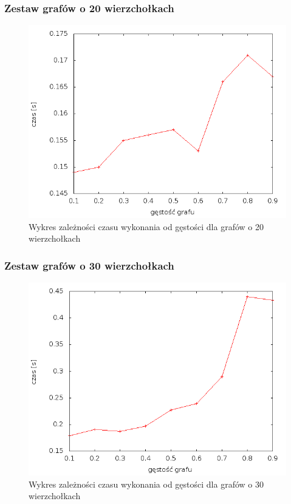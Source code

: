 \documentclass[12pt, a4paper]{article}
\begin{document}
\subsubsection*{Zestaw grafów o 20 wierzchołkach}
\begin{figure}[!h]
    \begin{center}
	\includegraphics[scale=0.5]{results///img/dim/dim_20.png}
	\caption{Wykres zależności czasu wykonania od gęstości dla grafów o 20 wierzchołkach}
    \end{center}
\end{figure}
\FloatBarrier
\newpage
\subsubsection*{Zestaw grafów o 30 wierzchołkach}
\begin{figure}[!h]
    \begin{center}
	\includegraphics[scale=0.5]{results/img/dim/dim_30.png}
	\caption{Wykres zależności czasu wykonania od gęstości dla grafów o 30 wierzchołkach}
    \end{center}
\end{figure}
\FloatBarrier
\end{document}
